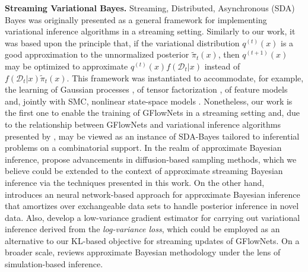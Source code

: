 \documentclass{article}
\newcommand{\pp}[1]{\vspace{0pt}\noindent\textbf{#1}}
\theoremstyle{plain}
\newtheorem{proposition}{Proposition}
\theoremstyle{definition}
\theoremstyle{remark}
\theoremstyle{remark}
\begin{document}
\pp{Streaming Variational Bayes.} Streaming, Distributed, Asynchronous (SDA) Bayes \cite{Broderick13} was originally presented as a general framework for implementing variational inference algorithms in a streaming setting. Similarly to our work, it was based upon the principle that, if the variational distribution $q^{(t)}(x)$ is a good approximation to the unnormalized posterior $\tilde{\pi}_{t}(x)$, then $q^{(t + 1)}(x)$ may be optimized to approximate $q^{(t)}(x) f(\mathcal{D}_{t} | x)$ instead of $f(\mathcal{D}_{t} | x) \tilde{\pi}_{t}(x)$. This framework was instantiated to accommodate, for example, the learning of Gaussian processes \cite{bui2017GPs}, of tensor factorization \cite{Fang21Tensor}, of feature models \cite{Schaeffer22features} and, jointly with SMC, nonlinear state-space models \cite{Zhao2023}. Nonetheless, our work is the first one to enable the training of GFlowNets in a streaming setting and, due to the relationship between GFlowNets and variational inference algorithms presented by \cite{malkin2023gflownets}, may be viewed as an instance of SDA-Bayes tailored to inferential problems on a combinatorial support. 
In the realm of approximate Bayesian inference, \citet{sendera2024diffusion, berner2022optimal, akhound2024iterated, zhang2018variational} propose advancements in diffusion-based sampling methods, which we believe could be extended to the context of approximate streaming Bayesian inference via the techniques presented in this work. 
On the other hand, \citet{mittal2023exploring} introduces an neural network-based approach for approximate Bayesian inference that amortizes over exchangeable data sets to handle posterior inference in novel data.  
Also, \citet{richter2023improved, richter2020vargrad} develop a low-variance gradient estimator for carrying out variational inference derived from the \emph{log-variance loss}, which could be employed as an alternative to our KL-based objective for streaming updates of GFlowNets. 
On a broader scale, \citet{cranmer2020frontier} reviews approximate Bayesian methodology under the lens of simulation-based inference.  

\end{document}
